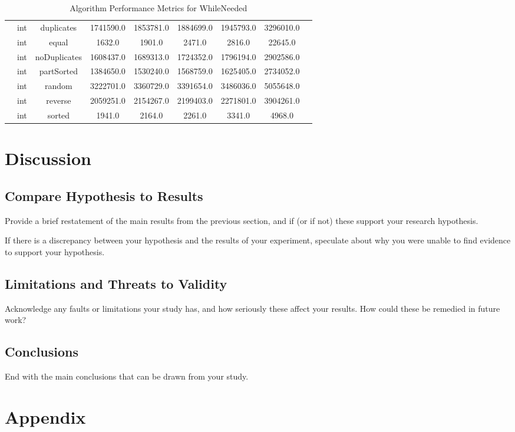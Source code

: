 \documentclass{article}
\begin{document}
\begin{table}[H]
\begin{tabular}{|c|c|c|c|c|c|c|c|c|}
        & int & duplicates & 1741590.0 & 1853781.0 & 1884699.0 & 1945793.0 & 3296010.0 \\
        & int & equal & 1632.0 & 1901.0 & 2471.0 & 2816.0 & 22645.0 \\
        & int & noDuplicates & 1608437.0 & 1689313.0 & 1724352.0 & 1796194.0 & 2902586.0 \\
        & int & partSorted & 1384650.0 & 1530240.0 & 1568759.0 & 1625405.0 & 2734052.0 \\
        & int & random & 3222701.0 & 3360729.0 & 3391654.0 & 3486036.0 & 5055648.0 \\
        & int & reverse & 2059251.0 & 2154267.0 & 2199403.0 & 2271801.0 & 3904261.0 \\
        & int & sorted & 1941.0 & 2164.0 & 2261.0 & 3341.0 & 4968.0 \\
        \bottomrule
    \end{tabular}
    \caption{Algorithm Performance Metrics for WhileNeeded}
\end{table}

\section{Discussion}
\subsection{Compare Hypothesis to Results}
Provide a brief restatement of the main results from the previous section, and if (or if not) these support your research hypothesis.

If there is a discrepancy between your hypothesis and the results of your experiment, speculate about why you were unable to find evidence to support your hypothesis. 


\subsection{Limitations and Threats to Validity}
Acknowledge any faults or limitations your study has, and how seriously these affect your
results. How could these be remedied in future work?

\subsection{Conclusions}
End with the main conclusions that can be drawn from your study.

\section{Appendix}
\end{document}
